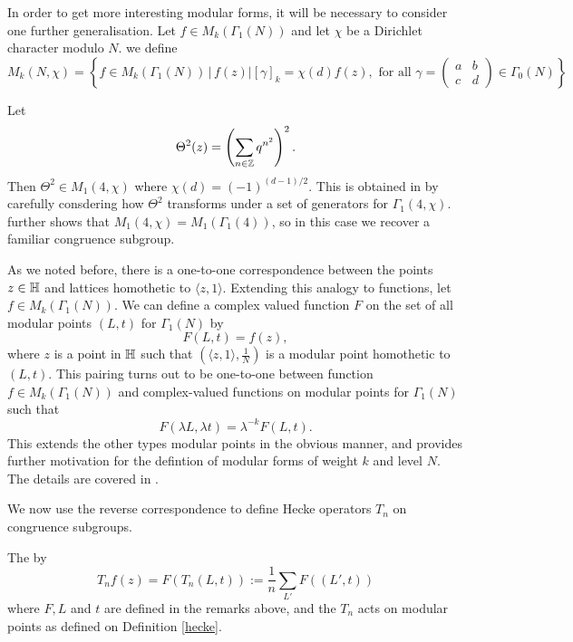 \documentclass[12pt, a4paper]{report}
\begin{document}
In order to get more interesting modular forms, it will be necessary to consider
one further generalisation. Let $f \in M_k(\Gamma_1(N))$ and let $\chi$ be a
Dirichlet character modulo $N$. we define
\[M_k(N, \chi) = \left\{ f \in M_k(\Gamma_1(N)) \, | \,
    f(z) | [\gamma]_k = \chi(d)f(z), \text{ for all } \gamma =
  \left(
    \begin{smallmatrix}
      a & b \\ c & d
    \end{smallmatrix}
\right) \in \Gamma_0(N) \right\}\]

\begin{example} \label{ex:theta}
  Let
  \[\Theta^2(z) = \left( \sum\limits_{n \in {\mathbb Z}} q^{n^2} \right)^2.\]
  Then $\Theta^2 \in M_1(4,\chi)$ where $\chi(d) = (-1)^{(d-1)/2}$.
  This is obtained in \cite[Proposition
  30]{koblitz} by carefully consdering how $\Theta^2$ transforms under a set of
  generators for $\Gamma_1(4, \chi)$. \cite[Proposition 28]{koblitz} further
  shows that $M_1(4, \chi) = M_1(\Gamma_1(4))$, so in this case we recover a
  familiar congruence subgroup.
\end{example}

As we noted before, there is a one-to-one correspondence
between the points $z\in \mathbb{H}$ and lattices homothetic to $\langle z, 1
\rangle$.
Extending this
analogy to functions, let $f \in M_k(\Gamma_1(N))$. We can define a complex
valued function
$F$ on the set of all modular points $(L,t)$ for $\Gamma_1(N)$ by
\[F(L,t) = f(z),\]
where $z$ is a point in $\mathbb{H}$ such that $(\langle z,1 \rangle, \frac{1}{N})$
is a modular point homothetic to $(L,t).$ This pairing turns out to be
one-to-one between function $f \in M_k(\Gamma_1(N))$ and complex-valued
functions on modular points for $\Gamma_1(N)$ such that
\[F(\lambda L, \lambda t) = \lambda^{-k} F(L, t).\]
This extends the other types modular points in the obvious manner, and
provides further motivation for the defintion of modular forms of weight
$k$ and level $N$. The details are covered in
\cite[Section III-5, Pages 153-155]{koblitz}.

We now use the reverse correspondence to define Hecke operators $T_n$ on
congruence subgroups.

\begin{defn} \label{defin_hecke}
  The  by
  \[T_nf(z) = F(T_n(L,t)) := \frac{1}{n} \sum\limits_{L'} F((L',t))\]
  where $F, L$ and $t$ are defined in the remarks above, and the $T_n$ acts on
  modular points as defined on Definition \ref{hecke}.
\end{defn}
\end{document}
